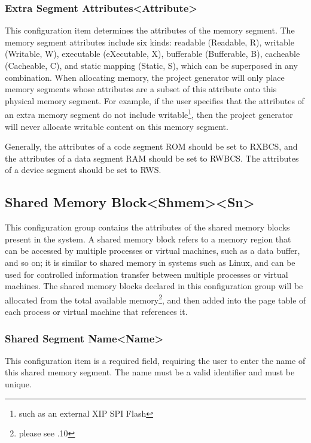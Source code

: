 \subsubsection{Extra Segment Attributes<Attribute>{}}\label{subsubsec:5-3-10-4}

This configuration item determines the attributes of the memory segment. The memory segment attributes include six kinds: readable (Readable, R), writable (Writable, W), executable (eXecutable, X), bufferable (Bufferable, B), cacheable (Cacheable, C), and static mapping (Static, S), which can be superposed in any combination. When allocating memory, the project generator will only place memory segments whose attributes are a subset of this attribute onto this physical memory segment. For example, if the user specifies that the attributes of an extra memory segment do not include writable\footnote{such as an external XIP SPI Flash}, then the project generator will never allocate writable content on this memory segment.

Generally, the attributes of a code segment ROM should be set to RXBCS, and the attributes of a data segment RAM should be set to RWBCS. The attributes of a device segment should be set to RWS.

\subsection{Shared Memory Block<Shmem><Sn>{}}\label{subsec:5-3-11}

This configuration group contains the attributes of the shared memory blocks present in the system. A shared memory block refers to a memory region that can be accessed by multiple processes or virtual machines, such as a data buffer, and so on; it is similar to shared memory in systems such as Linux, and can be used for controlled information transfer between multiple processes or virtual machines. The shared memory blocks declared in this configuration group will be allocated from the total available memory\footnote{please see .10}, and then added into the page table of each process or virtual machine that references it.

\subsubsection{Shared Segment Name<Name>{}}\label{subsubsec:5-3-11-1}

This configuration item is a required field, requiring the user to enter the name of this shared memory segment. The name must be a valid identifier and must be unique.

